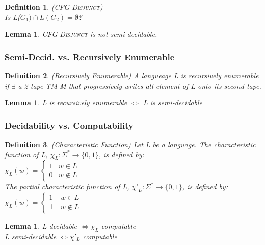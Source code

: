 \documentclass[a3paper, 8pt]{extarticle}
\newtheorem{lemma}[theorem]{Lemma}
\newtheorem*{definition}{Definition}
\begin{document}
\begin{multicols*}{6}
\begin{definition}
    \textsc{(CFG-Disjunct)}\\ Is L($G_1) \cap L(G_2)= \emptyset$?
\end{definition}

\begin{lemma}
    \textsc{CFG-Disjunct} is not semi-decidable.
\end{lemma}

\subsubsection{Semi-Decid. vs. Recursively Enumerable}

\begin{definition}
    (Recursively Enumerable) A langueage L is recursively enumerable if $\exists$ a 2-tape TM M that progressively writes all element of L onto its second tape.
\end{definition}

\begin{lemma}
    L is recursively enumerable $\iff$ L is semi-decidable
\end{lemma}

\subsubsection{Decidability vs. Computability}

\begin{definition}
    (Characteristic Function) Let L be a language. The characteristic function of L, $\chi_L: \Sigma^* \to \{0,1\}$, is defined by: \\
    $\chi_L  (w) = \begin{cases}
        1 & w \in L \\
        0 & w \notin L
    \end{cases}$\\
The partial characteristic function of L, $\chi'_L: \Sigma^* \to \{0,1\}$, is defined by: \\
    $\chi_L  (w) = \begin{cases}
        1 & w \in L \\
        \bot & w \notin L
    \end{cases}$
\end{definition}

\begin{lemma}
    L decidable $\iff \chi_L$ computable\\
    L semi-decidable $\iff \chi'_L$ computable
\end{lemma}

\end{multicols*}
\end{document}

